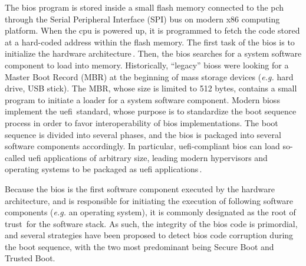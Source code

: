 The \ac{bios} program is stored inside a small flash memory connected
to the \ac{pch} through the Serial Peripheral Interface (SPI) bus on modern x86
computing platform.
%
When the \ac{cpu} is powered up, it is programmed   to fetch the code stored at a
hard-coded address within the flash memory.
%
The first task of the \ac{bios} is to initialize the hardware
architecture\,\cite{salihun2006bios}.
%
Then, the \ac{bios} searches for a system software component to load into
memory.
%
Historically, ``legacy'' \acp{bios} were looking for a Master Boot Record (MBR)
at the beginning of mass storage devices (\emph{e.g.} hard drive, USB stick).
%
The MBR, whose size is limited to 512 bytes, contains a small program to
initiate a loader for a system software component.
%
Modern \acp{bios} implement the \ac{uefi}\,\cite{zimmer2007uefi,uefi2017specs}
standard, whose purpose is to standardize the boot sequence process in order to
favor interoperability of \ac{bios} implementations.
%
The boot sequence is divided into several phases, and the \ac{bios} is packaged
into several software components accordingly.
%
In particular, \ac{uefi}-compliant \ac{bios} can load so-called \ac{uefi}
applications of arbitrary size, leading modern hypervisors and operating systems
to be packaged as \ac{uefi} applications\,\cite{2011efistub}.

Because the \ac{bios} is the first software component executed by the hardware
architecture, and is responsible for initiating the execution of following
software components (\emph{e.g.} an operating system), it is commonly designated
as the root of trust\,\cite{rutkowska2015intel} for the software stack.
%
As such, the integrity of the \ac{bios} code is primordial, and several
strategies have been proposed to detect \ac{bios} code corruption during the
boot sequence, with the two most predominant being Secure Boot  and Trusted Boot.

